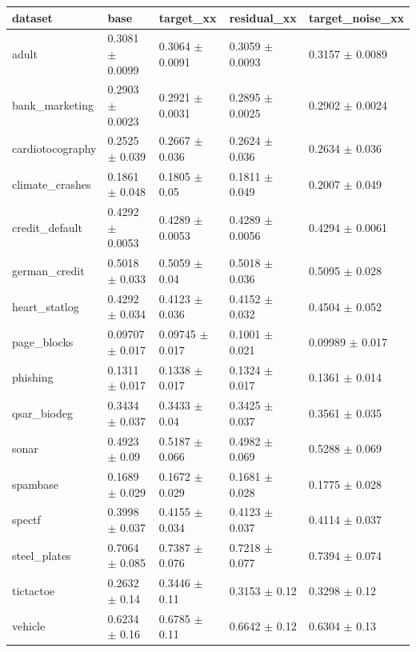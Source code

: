 \begin{tabular}{lllll}
\toprule
dataset & base & target\_xx & residual\_xx & target\_noise\_xx \\
\midrule
adult & 0.3081 $\pm$ 0.0099 & 0.3064 $\pm$ 0.0091 & 0.3059 $\pm$ 0.0093 & 0.3157 $\pm$ 0.0089 \\
bank\_marketing & 0.2903 $\pm$ 0.0023 & 0.2921 $\pm$ 0.0031 & 0.2895 $\pm$ 0.0025 & 0.2902 $\pm$ 0.0024 \\
cardiotocography & 0.2525 $\pm$ 0.039 & 0.2667 $\pm$ 0.036 & 0.2624 $\pm$ 0.036 & 0.2634 $\pm$ 0.036 \\
climate\_crashes & 0.1861 $\pm$ 0.048 & 0.1805 $\pm$ 0.05 & 0.1811 $\pm$ 0.049 & 0.2007 $\pm$ 0.049 \\
credit\_default & 0.4292 $\pm$ 0.0053 & 0.4289 $\pm$ 0.0053 & 0.4289 $\pm$ 0.0056 & 0.4294 $\pm$ 0.0061 \\
german\_credit & 0.5018 $\pm$ 0.033 & 0.5059 $\pm$ 0.04 & 0.5018 $\pm$ 0.036 & 0.5095 $\pm$ 0.028 \\
heart\_statlog & 0.4292 $\pm$ 0.034 & 0.4123 $\pm$ 0.036 & 0.4152 $\pm$ 0.032 & 0.4504 $\pm$ 0.052 \\
page\_blocks & 0.09707 $\pm$ 0.017 & 0.09745 $\pm$ 0.017 & 0.1001 $\pm$ 0.021 & 0.09989 $\pm$ 0.017 \\
phishing & 0.1311 $\pm$ 0.017 & 0.1338 $\pm$ 0.017 & 0.1324 $\pm$ 0.017 & 0.1361 $\pm$ 0.014 \\
qsar\_biodeg & 0.3434 $\pm$ 0.037 & 0.3433 $\pm$ 0.04 & 0.3425 $\pm$ 0.037 & 0.3561 $\pm$ 0.035 \\
sonar & 0.4923 $\pm$ 0.09 & 0.5187 $\pm$ 0.066 & 0.4982 $\pm$ 0.069 & 0.5288 $\pm$ 0.069 \\
spambase & 0.1689 $\pm$ 0.029 & 0.1672 $\pm$ 0.029 & 0.1681 $\pm$ 0.028 & 0.1775 $\pm$ 0.028 \\
spectf & 0.3998 $\pm$ 0.037 & 0.4155 $\pm$ 0.034 & 0.4123 $\pm$ 0.037 & 0.4114 $\pm$ 0.037 \\
steel\_plates & 0.7064 $\pm$ 0.085 & 0.7387 $\pm$ 0.076 & 0.7218 $\pm$ 0.077 & 0.7394 $\pm$ 0.074 \\
tictactoe & 0.2632 $\pm$ 0.14 & 0.3446 $\pm$ 0.11 & 0.3153 $\pm$ 0.12 & 0.3298 $\pm$ 0.12 \\
vehicle & 0.6234 $\pm$ 0.16 & 0.6785 $\pm$ 0.11 & 0.6642 $\pm$ 0.12 & 0.6304 $\pm$ 0.13 \\
\bottomrule
\end{tabular}
